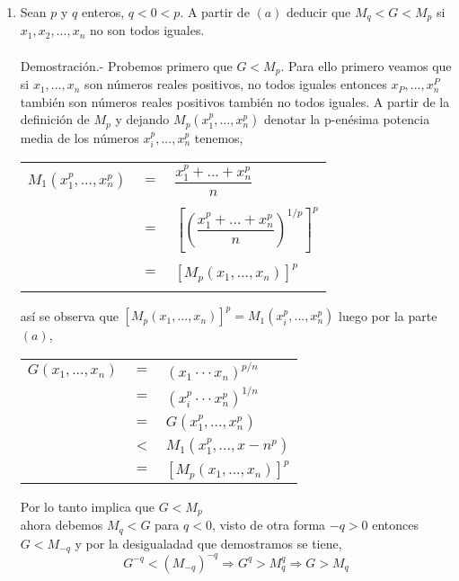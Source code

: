 \begin{enumerate}[ \bfseries 1.]
\begin{enumerate}[\bfseries (a)]
\item Sean $p$ y $q$ enteros, $q<0<p$. A partir de $(a)$ deducir que $M_q< G < M_p$ si $x_1,x_2,...,x_n$ no son todos iguales.\\\\
Demostración.- \; Probemos primero que $G < M_p$. Para ello primero veamos que si $x_1,...,x_n$ son números reales positivos, no todos iguales entonces $x_P,...,x_n^P$ también son números reales positivos también no todos iguales. A partir de la definición de $M_p$ y dejando $M_p(x_1^p,...,x_n^p)$ denotar la p-enésima potencia media de los números $x_i^p,...,x_n^p$ tenemos,
\begin{center}
\begin{tabular}{rcl}
$M_1(x_1^p,...,x_n^p)$&$=$&$\dfrac{x_1^p + ... + x_n^p}{n}$\\\\
&$=$&$\left[ \left( \dfrac{x_1^p + ... + x_n^p}{n} \right)^{1/p} \right]^p$\\\\
&$=$&$[M_p(x_1,...,x_n)]^p$\\\\
\end{tabular}
\end{center}
así se observa que $[M_p(x_1,...,x_n)]^p = M_1(x_i^p,...,x_n^p)$ luego por la parte $(a)$,
\begin{center}
\begin{tabular}{rcl}
$G(x_1,...,x_n)$&$=$&$(x_1\cdot \cdot \cdot x_n)^{p/n}$\\
&$=$&$(x_i^p \cdot \cdot \cdot x_n^p)^{1/n}$\\
&$=$&$G(x_1^p,...,x_n^p)$\\
&$<$&$M_1(x_1^p,...,x-n^p)$\\
&$=$&$[M_p(x_1,...,x_n)]^p$\\
\end{tabular}
\end{center}
Por lo tanto implica que  $G<M_p$\\
ahora debemos  $M_q<G$ para $q<0$, visto de otra forma $-q>0$ entonces $G<M_{-q}$ y por la desigualadad que demostramos se tiene, $$G^{-q}<(M_{-q})^{-q} \Rightarrow G^q > M_q^q \Rightarrow G > M_q$$\\\\
\end{enumerate}


\end{enumerate}
